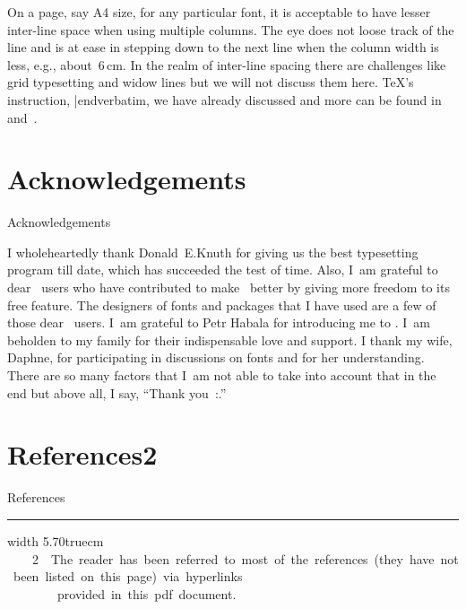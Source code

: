 {{On a page, say A4 size, for any particular font, it is acceptable to have lesser inter-line space when using multiple columns. The eye does not loose track of the line and is at ease in stepping down to the next line when the column width is less, e.g., about~6\,cm. In the realm of inter-line spacing there are challenges like grid typesetting and widow lines but we will not discuss them here. \TeX's instruction, {\color{brown}\verbatim \baselineskip|endverbatim}, we have already discussed and more can be found in \cite{knuth_texbook} and~\cite{against_widows}.



\section{Acknowledgements}{Acknowledgements}

\bs

\ii I wholeheartedly thank Donald~E.\;Knuth for giving us \capstex\emdash the best typesetting program till date, which has succeeded the test of time. Also, I~am grateful to dear \capstex\ users who have contributed to make \capstex\ better by giving more freedom to its free feature. The designers of fonts and packages that I have used are a few of those dear \capstex\ users. I~am grateful to Petr Habala for introducing me to \capstex. I~am beholden to my family for their indispensable love and support. I thank my wife, Daphne, for participating in discussions on fonts and for her understanding. There are so many factors that I~am not able to take into account that in the end but above all, I say, ``Thank you~{\dev :}.''









\section{References\hbox{\bf 2}}{References}

\hskip20cm\hbox{\cite{habala_amstex}\cite{knuth_texbook}\cite{fonts_tex_latex}\cite{elements_typographic}}






\vskip7.5cm\hrule width 5.70truecm\kern2mm\eightrm\fontss
\hbox{ \hbox{\ \ \ 2}\ \;  The reader has been referred to most of the references (they have not been listed on this page) via hyperlinks}
\hbox{\ \ \ \ \ \ \ \ provided in this {\caps pdf} document.}














}}
